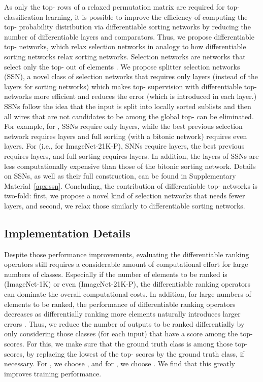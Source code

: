 \documentclass{article}
\begin{document}
As only the top- rows of a relaxed permutation matrix are required for top- classification learning, it is possible to improve the efficiency of computing the top- probability distribution via differentiable sorting networks by reducing the number of differentiable layers and comparators.
Thus, we propose differentiable top- networks, which relax selection networks in analogy to how differentiable sorting networks relax sorting networks.
Selection networks are networks that select only the top- out of  elements \citep{Knuth1998-3-SortingSearching}.
We propose splitter selection networks (SSN), a novel class of selection networks that requires only  layers (instead of the  layers for sorting networks) which makes top- supervision with differentiable top- networks more efficient and reduces the error (which is introduced in each layer.)
SSNs follow the idea that the input is split into locally sorted sublists and then all wires that are not candidates to be among the global top- can be eliminated.
For example, for , SSNs require only  layers, while the best previous selection network requires  layers and full sorting (with a bitonic network) requires even  layers. 
For  (i.e., for ImageNet-21K-P), SNNs require  layers, the best previous requires  layers, and full sorting requires  layers.
In addition, the layers of SSNs are less computationally expensive than those of the bitonic sorting network.
Details on SSNs, as well as their full construction, can be found in Supplementary Material~\ref{apx:ssn}.
Concluding, the contribution of differentiable top- networks is two-fold: first, we propose a novel kind of selection networks that needs fewer layers, and second, we relax those similarly to differentiable sorting networks.


\subsection{Implementation Details}
\label{sec:implementation_details}

Despite those performance improvements, evaluating the differentiable ranking operators still requires a considerable amount of computational effort for large numbers of classes. 
Especially if the number  of elements to be ranked is  (ImageNet-1K) or even  (ImageNet-21K-P), the differentiable ranking operators can dominate the overall computational costs.
In addition, for large numbers  of elements to be ranked, the performance of differentiable ranking operators decreases as differentially ranking more elements naturally introduces larger errors \citep{Grover2019-NeuralSort,prillo2020softsort,Cuturi2019-SortingOT,Petersen2021-diffsort}.
Thus, we reduce the number of outputs to be ranked differentially by only considering those classes (for each input) that have a score among the top- scores.
For this, we make sure that the ground truth class is among those top- scores, by replacing the lowest of the top- scores by the ground truth class, if necessary.
For , we choose , and for , we choose .
We find that this greatly improves training performance.
\end{document}
